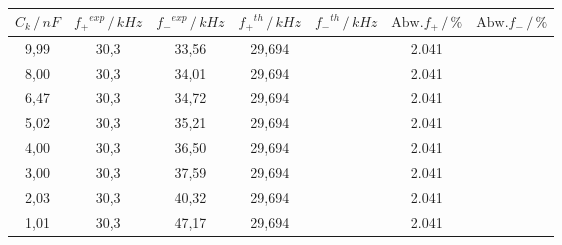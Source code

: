 \begin{table}[!h]
    \centering
    \caption{}
    \label{tabeigenfr}
    \begin{tabular}{c c c c c c c}
      \toprule
      $C_k\,/\,nF$ & ${f_+}^{exp}\,/\,kHz$ & ${f_-}^{exp}\,/\,kHz$ & ${f_+}^{th}\,/\,kHz$ & ${f_-}^{th}\,/\,kHz$ & $\text{Abw.}f_+\,/\,\text{\%}$ & $\text{Abw.}f_-\,/\,\text{\%}$ \\
      \midrule
      9,99 & 30,3 & 33,56 & 29,694 & & 2.041 & \\
      8,00 & 30,3 & 34,01 & 29,694 & & 2.041 & \\
      6,47 & 30,3 & 34,72 & 29,694 & & 2.041 & \\
      5,02 & 30,3 & 35,21 & 29,694 & & 2.041 & \\
      4,00 & 30,3 & 36,50 & 29,694 & & 2.041 & \\
      3,00 & 30,3 & 37,59 & 29,694 & & 2.041 & \\
      2,03 & 30,3 & 40,32 & 29,694 & & 2.041 & \\
      1,01 & 30,3 & 47,17 & 29,694 & & 2.041 & \\
      \bottomrule
    \end{tabular}
\end{table}
